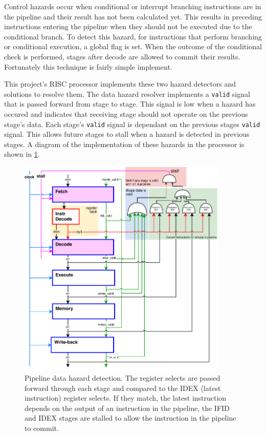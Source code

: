 Control hazards occur when conditional or interrupt branching instructions are in the pipeline and their result has not been calculated yet. This results in preceding instructions entering the pipeline when they should not be executed due to the conditional branch. To detect this hazard, for instructions that perform branching or conditional execution, a global flag is set. When the outcome of the conditional check is performed, stages after decode are allowed to commit their results. Fortunately this technique is fairly simple implement.

This project's RISC processor implements these two hazard detectors and solutions to resolve them. The data hazard resolver implements a \verb|valid| signal that is passed forward from stage to stage. This signal is low when a hazard has occured and indicates that receiving stage should not operate on the previous stage's data. Each stage's \verb|valid| signal is dependant on the previous stages \verb|valid| signal. This allows future stages to stall when a hazard is detected in previous stages. A diagram of the implementation of these hazards in the processor is shown in \cref{fig:stall}.

\begin{figure}[h]
\centering 
\includegraphics[width=10cm]{../img/stall}
\caption{Pipeline data hazard detection. The register selects are passed forward through each stage and compared to the IDEX (latest instruction) register selects. If they match, the latest instruction depends on the output of an instruction in the pipeline, the IFID and IDEX stages are stalled to allow the instruction in the pipeline to commit.}
\label{fig:stall}
\end{figure}

